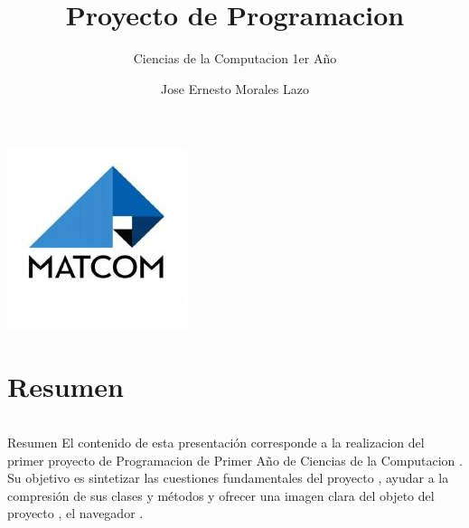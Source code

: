 \documentclass[11pt]{beamer}
\begin{document}
	\author[Jose Lazo]{Jose Ernesto Morales Lazo}
	\title{Proyecto de Programacion} 
	\subtitle{Ciencias de la Computacion 1er Año}
	
	
	\begin{frame}
		\includegraphics[scale=0.3]{matcom.jpg}
		\maketitle
	\end{frame}
	
	
	
	
	\section{Resumen}
	\begin{frame}
		\begin{columns}
			\begin{column}{.4\textwidth}
				\tableofcontents[sections={1-2},currentsection]
			\end{column}
			\begin{column}{.4\textwidth}
				\tableofcontents[sections={3-4},currentsection]
			\end{column}
		\end{columns}
	\end{frame}
	\begin{frame}{Resumen}
		\justifying
		El contenido de esta presentación corresponde a la realizacion del primer proyecto de Programacion de Primer Año de Ciencias de la Computacion . Su objetivo es sintetizar las cuestiones fundamentales del proyecto , ayudar a la compresión de sus clases y métodos y ofrecer una imagen clara del objeto del proyecto , el navegador .
	\end{frame}
	
\end{document}
